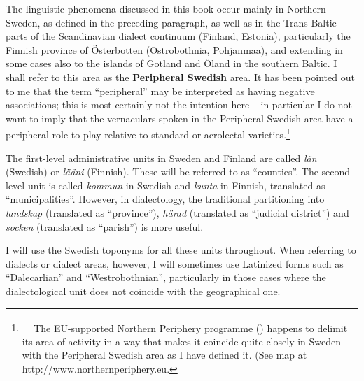 \begin{styleBodytextC}
The linguistic phenomena discussed in this book occur mainly in Northern Sweden, as defined in the preceding paragraph, as well as in the Trans-Baltic parts of the Scandinavian dialect continuum (Finland, Estonia), particularly the Finnish province of Österbotten (Ostrobothnia, Pohjanmaa), and extending in some cases also to the islands of Gotland and Öland in the southern Baltic. I shall refer to this area as the \textbf{Peripheral Swedish }area. It has been pointed out to me that the term “peripheral” may be interpreted as having negative associations; this is most certainly not the intention here – in particular I do not want to imply that the vernaculars spoken in the Peripheral Swedish area have a peripheral role to play relative to standard or acrolectal varieties.\footnote{\textsuperscript{\ \ } The EU-supported Northern Periphery programme () happens to delimit its area of activity in a way that makes it coincide quite closely in Sweden with the Peripheral Swedish area as I have defined it. (See map at http://www.northernperiphery.eu.} 

\end{styleBodytextC}


\begin{styleBodyTextFirst}
The first-level administrative units in Sweden and Finland are called \textit{län} (Swedish) or \textit{lääni} (Finnish). These will be referred to as “counties”. The second-level unit is called \textit{kommun} in Swedish and \textit{kunta} in Finnish, translated as “municipalities”. However, in dialectology, the traditional partitioning into \textit{landskap} (translated as “province”), \textit{härad} (translated as “judicial district”) and \textit{socken} (translated as “parish”) is more useful. 

\end{styleBodyTextFirst}

\begin{styleBodytextC}
I will use the Swedish toponyms for all these units throughout. When referring to dialects or dialect areas, however, I will sometimes use Latinized forms such as “Dalecarlian” and “Westrobothnian”, particularly in those cases where the dialectological unit does not coincide with the geographical one.

\end{styleBodytextC}

